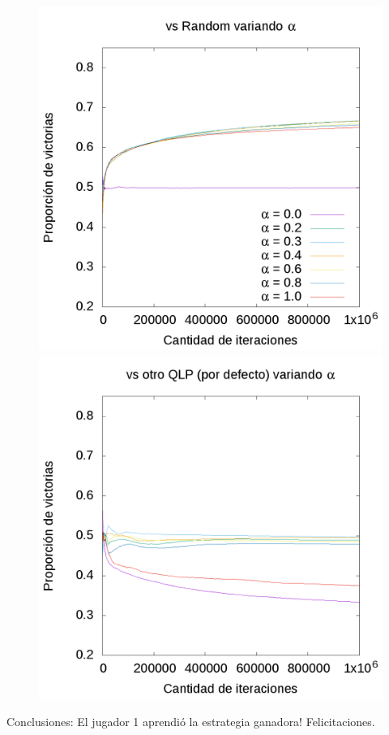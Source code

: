 \documentclass[10pt, a4paper]{article}
\begin{document}
\begin{figure}[ht]
\begin{minipage}[c]{1\textwidth}
	\includegraphics[trim=230mm 185mm 13mm 90mm, clip, scale=2.5]{AlphaR.png}
	\includegraphics[trim=235mm 125mm 0mm 150mm, clip, scale=2.5]{AlphaQ.png}
  \end{minipage}
\end{figure}

\restoregeometry

Conclusiones: El jugador 1 aprendió la estrategia ganadora! Felicitaciones.
\end{document}
